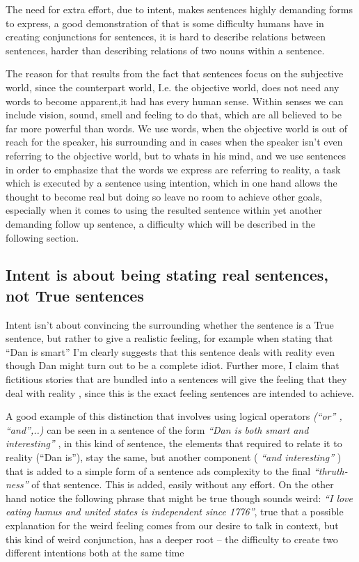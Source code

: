 \documentclass[10pt]{article}
\begin{document}
\par
The need for extra effort, due to intent, makes sentences  highly demanding forms to express, a good demonstration of that is some difficulty humans have in creating conjunctions for sentences, it is hard to describe relations between sentences, harder than describing  relations of two nouns within a sentence.\par

The reason for that  results from the fact that sentences focus on the subjective world, since the counterpart world, I.e. the objective world, does not need any words to become apparent,it had has every human sense. Within senses we can include vision, sound, smell and feeling to do that, which are all believed to be far more powerful than words. We use words, when the objective world is out of reach for the speaker, his surrounding and in cases when the speaker isn’t even referring to the objective world, but to whats in his mind, and we use sentences in order to emphasize that the words we express are referring to reality, a task which is executed by a sentence using intention, which in one hand allows the thought to become real but doing so leave no room to achieve other goals, especially when it comes to using the resulted sentence within yet another demanding follow up sentence, a difficulty which will be described in the following section.\par

\subsection*{Intent is about being stating real sentences, not True sentences}
Intent isn’t about convincing the surrounding whether the sentence is a True sentence, but rather to give a realistic feeling, for example when stating that “Dan is smart” I'm clearly suggests that this sentence deals with reality even though Dan might turn out to be a complete idiot. Further more, I claim that fictitious stories that are bundled into a sentences will give the feeling that they deal with reality , since this is the exact feeling sentences are intended to achieve.\par
A good example of this distinction that involves using logical operators \textit{(“or” , “and”,..)}  can be seen in a sentence of the form \textit{“Dan is both smart and interesting”} , in this kind of sentence,  the elements that required  to relate it to reality  (“Dan is”),  stay the same, but another component ( \textit{“and interesting” }) that is added to a simple form of a sentence ads complexity to the final \textit{“thruth-ness”} of that sentence. This is added, easily without any effort. On the other hand notice the following phrase that might be true though sounds weird: \textit{“I love eating humus and united states is independent since 1776”}, true that a possible explanation for the weird feeling comes from our desire to talk in context, but this kind of weird conjunction, has a deeper root – the difficulty to create two different intentions  both at the same time \par
\end{document}
